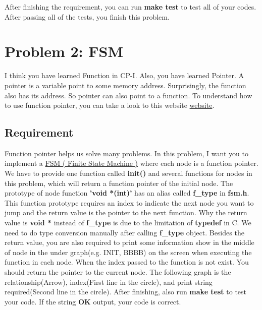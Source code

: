 \documentclass{report}
\begin{document}
After finishing the requirement, you can run \textbf{make test} to test all of
your codes.
After passing all of the tests, you finish this problem.

\section{Problem 2: FSM}

I think you have learned Function in CP-I. Also, you have learned Pointer. A
pointer is a variable point to some memory address.
Surprisingly, the function also has its address. So pointer can also point to a
function.
To understand how to use function pointer, you can take a look to this website
\href{https://chenhh.gitbooks.io/parallel_processing/content/cython/function_pointer.html}{website}.

\subsection{Requirement}

Function pointer helps us solve many problems. In this problem, I want you to implement a
\href{https://zh.wikipedia.org/zh-tw/%E6%9C%89%E9%99%90%E7%8A%B6%E6%80%81%E6%9C%BA}{FSM
  ( Finite State Machine )} where each node is a function pointer.
We have to provide one function called \textbf{init()} and several functions for
nodes in this problem, which will return a function pointer of the initial node. The prototype of node function
\textbf{'void *(int)'} has an alias called \textbf{f\_type} in
\textbf{fsm.h}. This function prototype requires an index to indicate the next
node you want to jump and the return
value is the pointer to the next function. Why the return value is \textbf{void *}
instead of \textbf{f\_type} is due to the limitation of \textbf{typedef} in C.
We need to do type conversion manually after calling \textbf{f\_type} object.
Besides the return value, you are also required to print some information show
in the middle of node in the under graph(e.g. INIT, BBBB) on the
screen when executing the function in each node. When the index passed to the
function is not exist. You should return the pointer to the current node.
The following graph is the relationship(Arrow), index(First line in the circle),
and print string required(Second line in the circle). After
finishing, also run \textbf{make test} to test your code. If the string \textbf{OK} output,
your code is correct.
\end{document}

